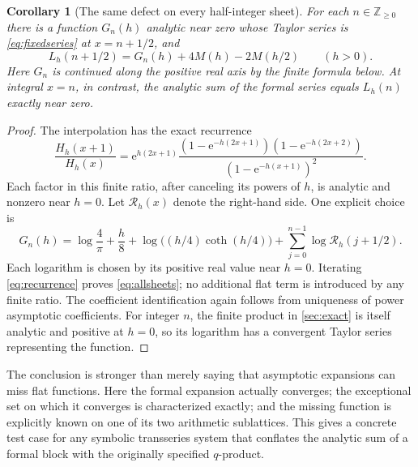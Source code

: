 \documentclass[11pt,a4paper]{article}
\numberwithin{equation}{section}
\newtheorem{corollary}[theorem]{Corollary}
\theoremstyle{definition}
\newcommand{\Z}{\mathbb Z}
\newcommand{\ee}{\mathrm e}
\begin{document}
\begin{corollary}[The same defect on every half-integer sheet]
\label{cor:allsheets}
For each $n\in\Z_{\ge0}$ there is a function $G_n(h)$ analytic near zero whose Taylor series is \eqref{eq:fixedseries} at $x=n+1/2$, and
\begin{equation}
L_h(n+1/2)=G_n(h)+4M(h)-2M(h/2)
\qquad(h>0).
\label{eq:allsheets}
\end{equation}
Here $G_n$ is continued along the positive real axis by the finite formula below. At integral $x=n$, in contrast, the analytic sum of the formal series equals $L_h(n)$ exactly near zero.
\end{corollary}
\begin{proof}
The interpolation has the exact recurrence
\begin{equation}
\frac{H_h(x+1)}{H_h(x)}
 =\ee^{h(2x+1)}
 \frac{(1-\ee^{-h(2x+1)})(1-\ee^{-h(2x+2)})}
      {(1-\ee^{-h(x+1)})^2}.
\label{eq:recurrence}
\end{equation}
Each factor in this finite ratio, after canceling its powers of $h$, is analytic and nonzero near $h=0$. Let $\mathcal R_h(x)$ denote the right-hand side. One explicit choice is
\begin{equation}
G_n(h)=\log\frac4\pi+\frac h8+
 \log\bigl((h/4)\coth(h/4)\bigr)
 +\sum_{j=0}^{n-1}\log\mathcal R_h(j+1/2).
\label{eq:Gn}
\end{equation}
Each logarithm is chosen by its positive real value near $h=0$. Iterating \eqref{eq:recurrence} proves \eqref{eq:allsheets}; no additional flat term is introduced by any finite ratio. The coefficient identification again follows from uniqueness of power asymptotic coefficients. For integer $n$, the finite product in \cref{sec:exact} is itself analytic and positive at $h=0$, so its logarithm has a convergent Taylor series representing the function.
\end{proof}

The conclusion is stronger than merely saying that asymptotic expansions can miss flat functions. Here the formal expansion actually converges; the exceptional set on which it converges is characterized exactly; and the missing function is explicitly known on one of its two arithmetic sublattices. This gives a concrete test case for any symbolic transseries system that conflates the analytic sum of a formal block with the originally specified $q$-product.
\end{document}
